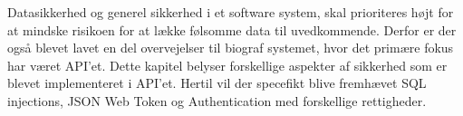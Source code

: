 ﻿Datasikkerhed og generel sikkerhed i et software system, 
skal prioriteres højt for at mindske risikoen for at lække følsomme data til uvedkommende. 
Derfor er der også blevet lavet en del overvejelser 
til biograf systemet, hvor det primære fokus har været API'et.
Dette kapitel belyser forskellige aspekter af sikkerhed som er blevet implementeret i API'et.
Hertil vil der specefikt blive fremhævet SQL injections, JSON Web Token og Authentication med forskellige rettigheder.